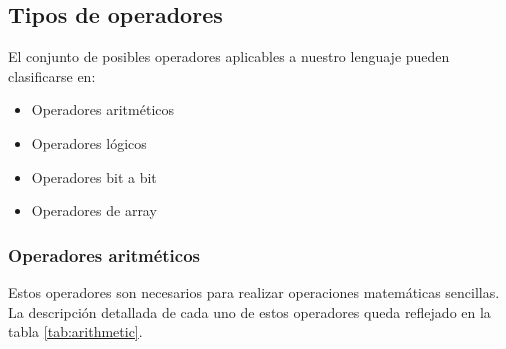 \documentclass[11pt, english]{article}
\begin{document}
	\subsection{Tipos de operadores}\label{operators}
	El conjunto de posibles operadores aplicables a nuestro lenguaje pueden clasificarse en:
	\begin{itemize}
		\item Operadores aritméticos
		\item Operadores lógicos
		\item Operadores bit a bit
		\item Operadores de array
	\end{itemize}
	
	
	\subsubsection{Operadores aritméticos}\label{arithmetic-operators}
	Estos operadores son necesarios para realizar operaciones matemáticas sencillas. La descripción detallada de cada uno de estos operadores queda reflejado en la tabla \ref{tab:arithmetic}.
	
\end{document}
